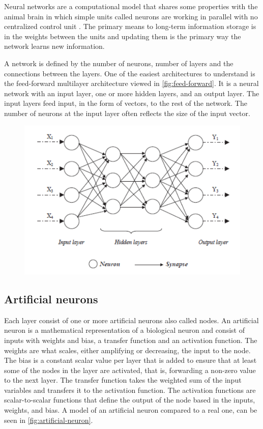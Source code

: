 Neural networks are a computational model that shares some properties with the animal brain in which simple units called neurons are working in parallel with no centralized control unit \cite{Patterson2017}. The primary means to long-term information storage is in the weights between the units and updating them is the primary way the network learns new information.

A network is defined by the number of neurons, number of layers and the connections between the layers. One of the easiest architectures to understand is the feed-forward multilayer architecture viewed in \autoref{fig:feed-forward}. It is a neural network with an input layer, one or more hidden layers, and an output layer. The input layers feed input, in the form of vectors, to the rest of the network. The number of neurons at the input layer often reflects the size of the input vector.

\begin{figure}[H]
    \centering
    \includegraphics[width=0.8\linewidth]{fig/feedforward-neural-network.png}
    \label{fig:feed-forward}
\end{figure}

\subsection{Artificial neurons}
Each layer consist of one or more artificial neurons also called nodes. An artificial neuron is a mathematical representation of a biological neuron and consist of inputs with weights and bias, a transfer function and an activation function. The weights are what scales, either amplifying or decreasing, the input to the node. The bias is a constant scalar value per layer that is added to ensure that at least some of the nodes in the layer are activated, that is, forwarding a non-zero value to the next layer. The transfer function takes the weighted sum of the input variables and transfers it to the activation function. The activation functions are scalar-to-scalar functions that define the output of the node based in the inputs, weights, and bias. A model of an artificial neuron compared to a real one, can be seen in \autoref{fig:artificial-neuron}. 


